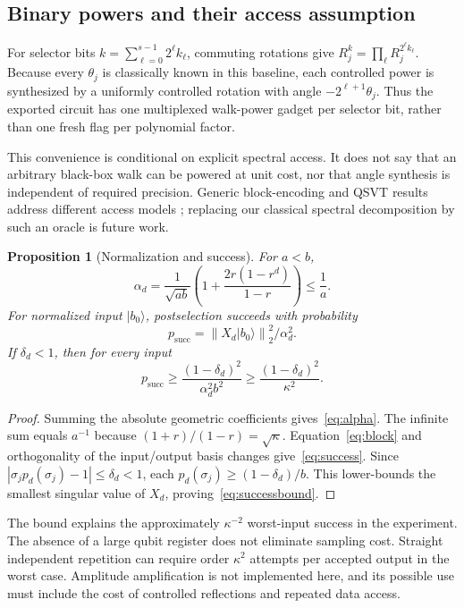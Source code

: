 \documentclass[journal]{IEEEtran}
\newtheorem{proposition}{Proposition}
\newcommand{\norm}[1]{\left\lVert#1\right\rVert}
\newcommand{\ket}[1]{\lvert#1\rangle}
\begin{document}
\subsection{Binary powers and their access assumption}
For selector bits $k=\sum_{\ell=0}^{s-1}2^\ell k_\ell$, commuting rotations
give $R_j^k=\prod_\ell R_j^{2^\ell k_\ell}$. Because every $\theta_j$ is
classically known in this baseline, each controlled power is synthesized by
a uniformly controlled rotation with angle $-2^{\ell+1}\theta_j$.
Thus the exported circuit has one multiplexed walk-power gadget per selector
bit, rather than one fresh flag per polynomial factor.

This convenience is conditional on explicit spectral access. It does not
say that an arbitrary black-box walk can be powered at unit cost, nor that
angle synthesis is independent of required precision. Generic block-encoding
and QSVT results address different access models \cite{gilyen2019}; replacing
our classical spectral decomposition by such an oracle is future work.

\begin{proposition}[Normalization and success]
For $a<b$,
\begin{equation}
 \alpha_d=\frac1{\sqrt{ab}}
 \left(1+\frac{2r(1-r^d)}{1-r}\right)\leq\frac1a.
 \label{eq:alpha}
\end{equation}
For normalized input $\ket{b_0}$, postselection succeeds with probability
\begin{equation}
 p_{\mathrm{succ}}=\norm{X_d\ket{b_0}}_2^2/\alpha_d^2.
 \label{eq:success}
\end{equation}
If $\delta_d<1$, then for every input
\begin{equation}
 p_{\mathrm{succ}}\geq
 \frac{(1-\delta_d)^2}{\alpha_d^2b^2}
 \geq\frac{(1-\delta_d)^2}{\kappa^2}.
 \label{eq:successbound}
\end{equation}
\end{proposition}
\begin{proof}
Summing the absolute geometric coefficients gives~\eqref{eq:alpha}.
The infinite sum equals $a^{-1}$ because $(1+r)/(1-r)=\sqrt\kappa$.
Equation~\eqref{eq:block} and orthogonality of the input/output basis changes
give~\eqref{eq:success}. Since
$|\sigma_jp_d(\sigma_j)-1|\leq\delta_d<1$, each
$p_d(\sigma_j)\geq(1-\delta_d)/b$. This lower-bounds the smallest singular
value of $X_d$, proving~\eqref{eq:successbound}.
\end{proof}

The bound explains the approximately $\kappa^{-2}$ worst-input success in
the experiment. The absence of a large qubit register does not eliminate
sampling cost. Straight independent repetition can require order
$\kappa^2$ attempts per accepted output in the worst case. Amplitude
amplification is not implemented here, and its possible use must include
the cost of controlled reflections and repeated data access.
\end{document}
